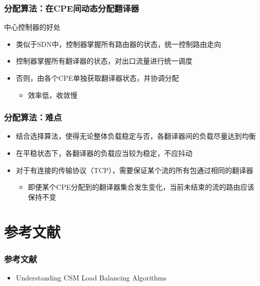 \documentclass{beamer}
\begin{document}
\begin{frame}
  \frametitle{分配算法：在CPE间动态分配翻译器}
  \begin{block}{中心控制器的好处}
    \begin{itemize}
    \item 类似于SDN中，控制器掌握所有路由器的状态，统一控制路由走向
    \item 控制器掌握所有翻译器的状态，对出口流量进行统一调度
    \item 否则，由各个CPE单独获取翻译器状态，并协调分配
      \begin{itemize}
      \item 效率低，收敛慢
      \end{itemize}
    \end{itemize}
  \end{block}
\end{frame}

\begin{frame}
  \frametitle{分配算法：难点}
  \begin{itemize}
  \item 结合选择算法，使得无论整体负载稳定与否，各翻译器间的负载尽量达到均衡
  \item 在平稳状态下，各翻译器的负载应当较为稳定，不应抖动
  \item 对于有连接的传输协议（TCP），需要保证某个流的所有包通过相同的翻译器
    \begin{itemize}
    \item 即便某个CPE分配到的翻译器集合发生变化，当前未结束的流的路由应该保持不变
    \end{itemize}
  \end{itemize}
\end{frame}

\section{参考文献}
\begin{frame}
  \frametitle{参考文献}
  \begin{itemize}
  \item Understanding CSM Load Balancing Algorithms
  \end{itemize}
\end{frame}
\end{document}
